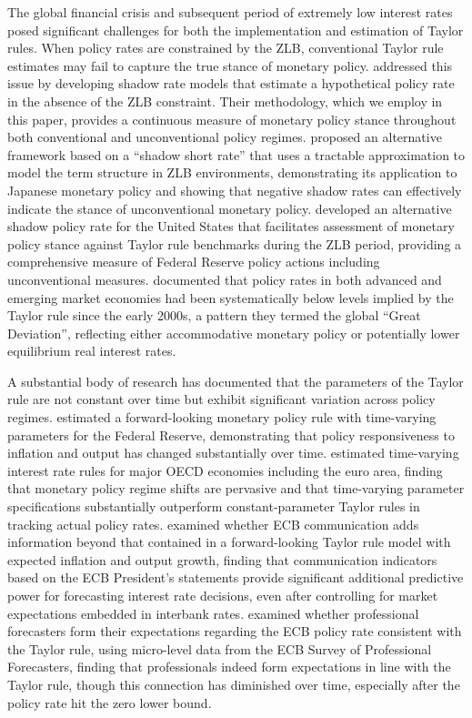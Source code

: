 \par The global financial crisis and subsequent period of extremely low interest rates posed significant challenges for both the implementation and estimation of Taylor rules. When policy rates are constrained by the ZLB, conventional Taylor rule estimates may fail to capture the true stance of monetary policy. \cite{wu2016measuring} addressed this issue by developing shadow rate models that estimate a hypothetical policy rate in the absence of the ZLB constraint. Their methodology, which we employ in this paper, provides a continuous measure of monetary policy stance throughout both conventional and unconventional policy regimes. \cite{krippner2013measuring} proposed an alternative framework based on a ``shadow short rate'' that uses a tractable approximation to model the term structure in ZLB environments, demonstrating its application to Japanese monetary policy and showing that negative shadow rates can effectively indicate the stance of unconventional monetary policy. \cite{lombardi2018taylor} developed an alternative shadow policy rate for the United States that facilitates assessment of monetary policy stance against Taylor rule benchmarks during the ZLB period, providing a comprehensive measure of Federal Reserve policy actions including unconventional measures. \cite{hofmann2012taylor} documented that policy rates in both advanced and emerging market economies had been systematically below levels implied by the Taylor rule since the early 2000s, a pattern they termed the global ``Great Deviation'', reflecting either accommodative monetary policy or potentially lower equilibrium real interest rates.
\par A substantial body of research has documented that the parameters of the Taylor rule are not constant over time but exhibit significant variation across policy regimes. \cite{kim2006estimation} estimated a forward-looking monetary policy rule with time-varying parameters for the Federal Reserve, demonstrating that policy responsiveness to inflation and output has changed substantially over time. \cite{trecroci2010monetary} estimated time-varying interest rate rules for major OECD economies including the euro area, finding that monetary policy regime shifts are pervasive and that time-varying parameter specifications substantially outperform constant-parameter Taylor rules in tracking actual policy rates. \cite{sturm2011communication} examined whether ECB communication adds information beyond that contained in a forward-looking Taylor rule model with expected inflation and output growth, finding that communication indicators based on the ECB President's statements provide significant additional predictive power for forecasting interest rate decisions, even after controlling for market expectations embedded in interbank rates. \cite{czudaj2023forecasts} examined whether professional forecasters form their expectations regarding the ECB policy rate consistent with the Taylor rule, using micro-level data from the ECB Survey of Professional Forecasters, finding that professionals indeed form expectations in line with the Taylor rule, though this connection has diminished over time, especially after the policy rate hit the zero lower bound.
